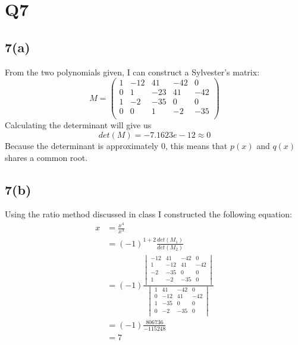 \documentclass{article}
\begin{document}
\section{Q7}
\subsection*{7(a)}
From the two polynomials given, I can construct a Sylvester's matrix:
\begin{equation*}
M = 
\begin{pmatrix}
1 &-12 &41 &-42& 0\\
0 &1   &-23 & 41 & -42\\
1& -2& -35& 0& 0\\
0& 0& 1& -2& -35\\ 
\end{pmatrix}
\end{equation*}
Calculating the determinant will give us
\begin{equation*}
det(M) = -7.1623e-12 \approx 0
\end{equation*}
Because the determinant is approximately 0, this means that $p(x)$ and $q(x)$ shares a common root.
\subsection*{7(b)}
Using the ratio method discussed in class I constructed the following equation:
\begin{equation*}
\begin{aligned}
x &= \frac{x^4}{x^3} \\
&=(-1)^{1+2}\frac{det(M_1)}{det(M_2)} \\
&=(-1)\frac{
	\begin{vmatrix}
	-12 & 41 &-42 &  0\\
	  1 &-12 & 41 &-42\\
	 -2 &-35 &  0 &  0\\
	  1 & -2 &-35 &  0\\
	\end{vmatrix}
}{
	\begin{vmatrix}
	  1 & 41 &-42 &  0\\
	  0 &-12 & 41 &-42\\
	  1 &-35 &  0 &  0\\
	  0 & -2 &-35 &  0\\	
	\end{vmatrix}
}\\
&=(-1)\frac{806736}{-115248}\\
&=7
\end{aligned}
\end{equation*}
\end{document}
